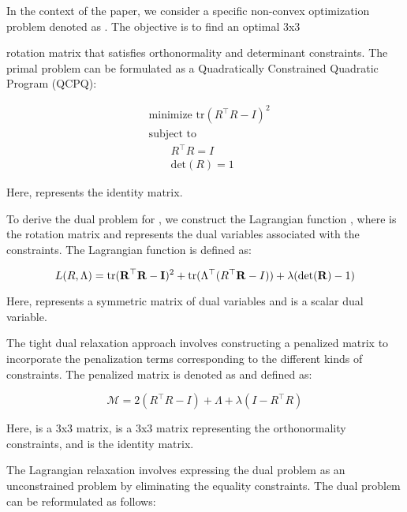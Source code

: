 In the context of the paper, we consider a specific non-convex optimization problem denoted as . The objective is to find an optimal 3x3

 rotation matrix  that satisfies orthonormality and determinant constraints. The primal problem  can be formulated as a Quadratically Constrained Quadratic Program (QCPQ):

\begin{align*}
	& \text{minimize } \text{tr}(R^\top R - I)^2 \\
	& \text{subject to } \\
	& \quad\quad R^\top R = I \\
	& \quad\quad \text{det}(R) = 1
\end{align*}


Here,  represents the identity matrix.

To derive the dual problem for , we construct the Lagrangian function , where  is the rotation matrix and \mvar{\Lambda} represents the dual variables associated with the constraints. The Lagrangian function is defined as:

\begin{equation}
	L(R, \Lambda) = \text{tr}(\bm{\mathrm{R}}^\top \bm{\mathrm{R}} - \bm{\mathrm{I}})^2 + \text{tr}(\Lambda^\top (R^\top \bm{\mathrm{R}} - I)) + \lambda(\text{det}(\bm{\mathrm{R}}) - 1)
\end{equation}


Here, \mvar{\Lambda} represents a symmetric matrix of dual variables and \mvar{\lambda} is a scalar dual variable.

The tight dual relaxation approach involves constructing a penalized matrix to incorporate the penalization terms corresponding to the different kinds of constraints. The penalized matrix is denoted as  and defined as:

\begin{equation}
	\mathcal{M} = 2(R^\top R - I) + \Lambda + \lambda(I - R^\top R)
\end{equation}


Here,  is a 3x3 matrix,  is a 3x3 matrix representing the orthonormality constraints, and  is the identity matrix.

The Lagrangian relaxation involves expressing the dual problem as an unconstrained problem by eliminating the equality constraints. The dual problem can be reformulated as follows:

